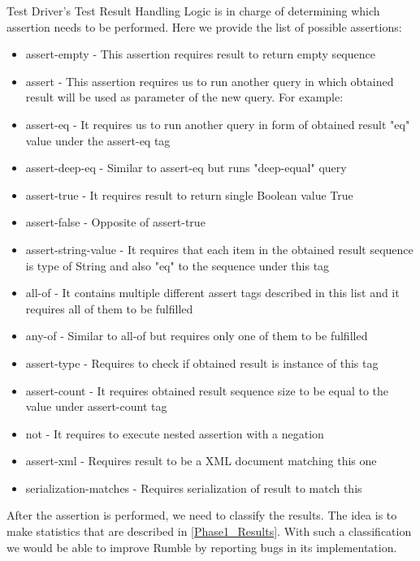Test Driver's Test Result Handling Logic is in charge of determining which assertion needs to be performed. Here we provide the list of possible assertions:

\begin{itemize}
	\item assert-empty - This assertion requires result to return empty sequence
	\item assert - This assertion requires us to run another query in which obtained result will be used as parameter of the new query. For example:
	
	\item assert-eq - It requires us to run another query in form of obtained result "eq" value under the assert-eq tag
	\item assert-deep-eq - Similar to assert-eq but runs "deep-equal" query
	\item assert-true - It requires result to return single Boolean value True
	\item assert-false - Opposite of assert-true
	\item assert-string-value - It requires that each item in the obtained result sequence is type of String and also "eq" to the sequence under this tag
	\item all-of - It contains multiple different assert tags described in this list and it requires all of them to be fulfilled 
	\item any-of - Similar to all-of but requires only one of them to be fulfilled
	\item assert-type - Requires to check if obtained result is instance of this tag
	\item assert-count - It requires obtained result sequence size to be equal to the value under assert-count tag
	\item not - It requires to execute nested assertion with a negation
	\item assert-xml - Requires result to be a XML document matching this one
	\item serialization-matches - Requires serialization of result to match this
\end{itemize}

After the assertion is performed, we need to classify the results. The idea is to make statistics that are described in \ref{Phase1_Results}. With such a classification we would be able to improve Rumble by reporting bugs in its implementation.

